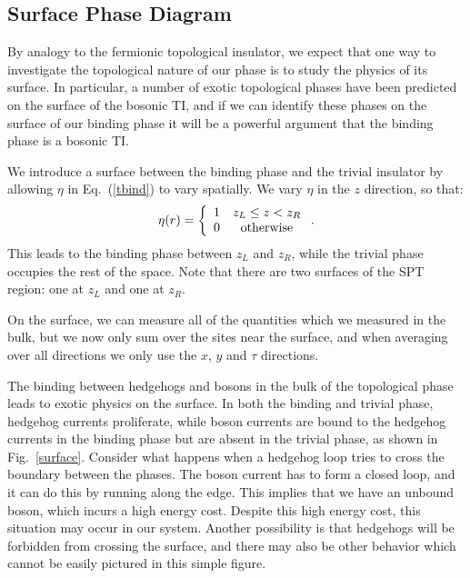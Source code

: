\documentclass[prb,twocolumn]{revtex4-1}
\begin{document}
\subsection{Surface Phase Diagram}
\label{subsec:heissurf}
By analogy to the fermionic topological insulator, we expect that one way to investigate the topological nature of our phase is to study the physics of its surface. In particular, a number of exotic topological phases have been predicted on the surface of the bosonic TI\cite{SenthilVishwanath}, and if we can identify these phases on the surface of our binding phase it will be a powerful argument that the binding phase is a bosonic TI.

We introduce a surface between the binding phase and the trivial insulator by allowing $\eta$ in Eq.~(\ref{tbind}) to vary spatially.
We vary $\eta$ in the $z$ direction, so that:
\begin{equation}
\eta(r)=
\left\{ \begin{array}{cc}
1 & z_L\leq z<z_R\\
0 & \rm{otherwise}\\
\end{array}\right..
\end{equation}
This leads to the binding phase between $z_L$ and $z_R$, while the trivial phase occupies the rest of the space. Note that there are two surfaces of the SPT region: one at $z_L$ and one at $z_R$.

On the surface, we can measure all of the quantities which we measured in the bulk, but we now only sum over the sites near the surface, and when averaging over all directions we only use the $x$, $y$ and $\tau$ directions. 

The binding between hedgehogs and bosons in the bulk of the topological phase leads to exotic physics on the surface. In both the binding and trivial phase, hedgehog currents proliferate, while boson currents are bound to the hedgehog currents in the binding phase but are absent in the trivial phase, as shown in Fig.~\ref{surface}. Consider what happens when a hedgehog loop tries to cross the boundary between the phases. The boson current has to form a closed loop, and it can do this by running along the edge. This implies that we have an unbound boson, which incurs a high energy cost. Despite this high energy cost, this situation may occur in our system.
Another possibility is that hedgehogs will be forbidden from crossing the surface, and there may also be other behavior which cannot be easily pictured in this simple figure. 
\end{document}
